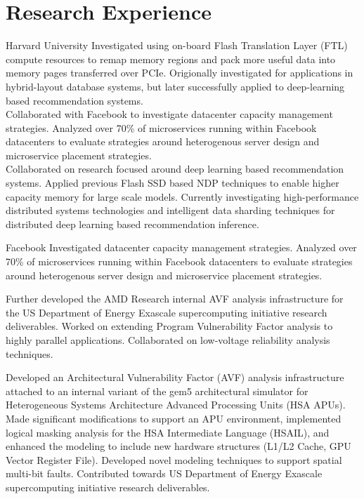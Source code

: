 \section{Research Experience}

 {Harvard University}{}
  { Investigated using on-board Flash Translation Layer (FTL) compute resources to remap memory regions and pack more useful data into memory pages transferred over PCIe. Origionally investigated for applications in hybrid-layout database systems, but later successfully applied to deep-learning based recommendation systems. \\
    Collaborated with Facebook to investigate datacenter capacity management strategies. Analyzed over 70\% of microservices running within Facebook datacenters to evaluate strategies around heterogenous server design and microservice placement strategies. \\
    Collaborated on research focused around deep learning based recommendation systems. Applied previous Flash SSD based NDP techniques to enable higher capacity memory for large scale models. Currently investigating high-performance distributed systems technologies and intelligent data sharding techniques for distributed deep learning based recommendation inference. \\
  }

 {Facebook}{}
  {
    Investigated datacenter capacity management strategies. Analyzed over 70\% of microservices running within Facebook datacenters to evaluate strategies around heterogenous server design and microservice placement strategies. \\
  }

  { Further developed the AMD Research internal AVF analysis infrastructure for the US Department of Energy Exascale supercomputing initiative research deliverables. Worked on extending Program Vulnerability Factor analysis to highly parallel applications. Collaborated on low-voltage reliability analysis techniques. \\
  }

  { Developed an Architectural Vulnerability Factor (AVF) analysis infrastructure attached to an internal variant of the gem5 architectural simulator for Heterogeneous Systems Architecture Advanced Processing Units (HSA APUs). Made significant modifications to support an APU environment, implemented logical masking analysis for the HSA Intermediate Language (HSAIL), and enhanced the modeling to include new hardware structures (L1/L2 Cache, GPU Vector Register File). Developed novel modeling techniques to support spatial multi-bit faults. Contributed towards US Department of Energy Exascale supercomputing initiative research deliverables. \\
  }

